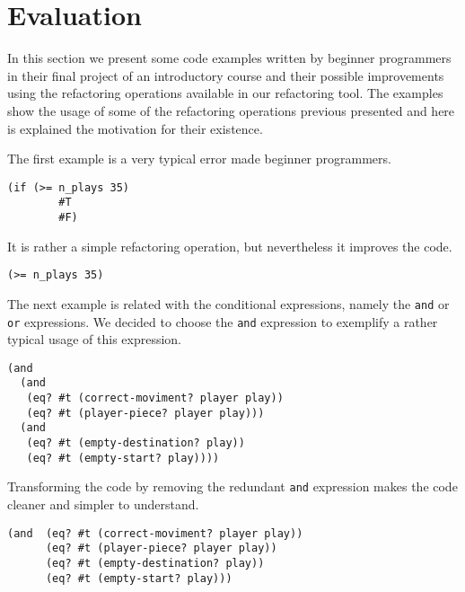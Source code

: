 

\section{Evaluation}
In this section we present some code examples written by beginner programmers
in their final project of an introductory course and their possible improvements
using the refactoring operations available in our refactoring tool.
The examples show the usage of some of the refactoring operations previous presented
and here is explained the motivation for their existence.

\lstset{style=racket}


The first example is a very typical error made beginner programmers.
\begin{lstlisting}[basicstyle=\ttfamily]
  (if (>= n_plays 35)
        #T
        #F)
\end{lstlisting}
It is rather a simple refactoring operation, but nevertheless it improves the code.
\begin{lstlisting}[basicstyle=\ttfamily]
  (>= n_plays 35)
\end{lstlisting}

The next example is related with the conditional expressions, namely the {\tt and}
or {\tt or} expressions. We decided to choose the {\tt and} expression to exemplify a
rather typical usage of this expression.
\begin{lstlisting}[basicstyle=\ttfamily]
(and
  (and
   (eq? #t (correct-moviment? player play))
   (eq? #t (player-piece? player play)))
  (and
   (eq? #t (empty-destination? play))
   (eq? #t (empty-start? play))))
\end{lstlisting}


Transforming the code by removing the redundant {\tt and} expression makes the code
cleaner and simpler to understand.
\begin{lstlisting}[basicstyle=\ttfamily]
(and  (eq? #t (correct-moviment? player play))
      (eq? #t (player-piece? player play))
      (eq? #t (empty-destination? play))
      (eq? #t (empty-start? play)))
\end{lstlisting}

